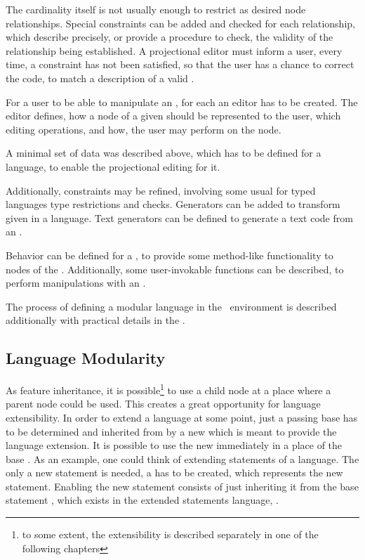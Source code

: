 The cardinality itself is not usually enough to restrict as desired node relationships. Special constraints can be added and checked for 
each relationship, which describe precisely, or provide a procedure to check, the validity of the relationship being established. A projectional editor
must inform a user, every time, a constraint has not been satisfied, so that the user has a chance to 
correct the code, to match a description of a valid .

For a user to be able to manipulate an , for each   an editor has to be created. The editor defines, how a node of a given 
should be represented to the user, which editing operations, and how, the user may perform on the node.

A minimal set of data was described above, which has to be defined for a language, to enable the projectional editing for it.

Additionally, constraints may be refined, involving some usual for typed languages type restrictions and checks. Generators can be added to 
transform  given in a language. Text generators can be defined to generate a text code from an .

Behavior can be defined for a , to provide some method-like functionality to nodes of the . 
Additionally, some user-invokable functions can be described, to perform manipulations with an .

The process of defining a modular language in the \jbmps\ environment is described additionally with practical details in the .

\subsection{Language Modularity}
\label{modularity}

As  feature inheritance, it is possible\footnote{to some extent, the extensibility is described separately in one of the following chapters} 
to use a child  node at a place where a parent  node could be used. This creates a great opportunity for language extensibility. In order to 
extend a language at some point, just a passing base  has to be determined and inherited from by a new  which is meant
to provide the language extension. It is possible to use the new  immediately  in a place of the base . 
As an example, one could think  of extending statements of a language. The only a new statement is needed, a  has to be created, 
which represents the new statement. Enabling the new statement consists of just inheriting it from the base statement , 
which exists in the extended statements language, .

